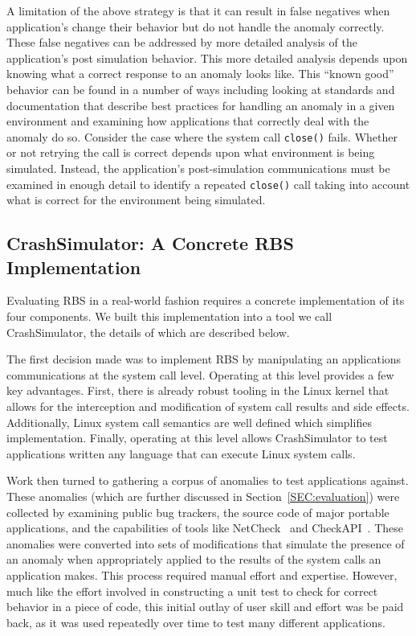 A limitation of the above strategy
is that it can result in false negatives
when application's change their behavior
but do not handle the anomaly correctly.
These false negatives can be addressed
by more detailed analysis
of the application's post simulation behavior.
This more detailed analysis
depends upon knowing what a correct response
to an anomaly looks like.
This ``known good'' behavior can be found
in a number of ways
including looking at standards and documentation
that describe best practices for handling an anomaly
in a given environment
and examining how applications that correctly
deal with the anomaly do so.
Consider the case where the system call {\tt close()} fails.
Whether or not retrying the call is correct
depends upon what environment is being simulated.
Instead, the application's post-simulation communications
must be examined in enough detail to identify a repeated {\tt close()}
call taking into account
what is correct for the environment being simulated.

\subsection{CrashSimulator: A Concrete RBS Implementation}

Evaluating RBS in a real-world fashion
requires a concrete implementation of its four components.
We built this implementation
into a tool we call CrashSimulator,
the details of which are described below.

The first decision made was to implement RBS by manipulating an
applications communications at the system call level.
Operating at this level provides a few key
advantages.  First, there is already robust tooling in the Linux kernel
that allows for the interception and modification of system call results
and side effects.  Additionally, Linux system call semantics are well
defined which simplifies implementation.  Finally, operating at this level
allows CrashSimulator to test applications written any language that can
execute Linux system calls.

Work then turned to gathering a corpus of anomalies to test applications
against.  These anomalies (which are further discussed
in Section~\ref{SEC:evaluation})
were collected by examining public bug trackers,
the source code of major portable applications, and the capabilities of
tools like NetCheck~\cite{Zhuang_NSDI_2014}
and CheckAPI~\cite{rasley2015detecting}.  These anomalies were converted
into sets of modifications that simulate the presence of an anomaly when
appropriately applied to the results of the system calls an application
makes.
This process required manual effort and expertise.  However,
much like
the effort involved in constructing a unit test to check for correct
behavior in a piece of code, this initial outlay of
user skill and effort was be paid back, as it was
used repeatedly over time to test many different applications.

